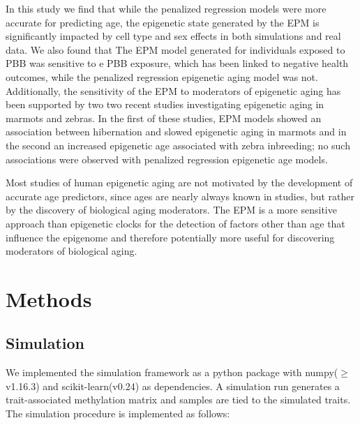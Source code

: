 \documentclass{article}
\begin{document}
{{\begin{linenumbers}
In this study we find that while the penalized regression models were more accurate for predicting age, the epigenetic 
state generated by the EPM is significantly impacted by  cell type and sex effects in both simulations and real data. 
We also found that The EPM model generated for individuals exposed to PBB was sensitive to e PBB exposure, which has 
been linked to negative health outcomes, while the penalized regression epigenetic aging model was not. Additionally, 
the sensitivity of the EPM to moderators of epigenetic aging has been supported by two two recent studies  
investigating epigenetic aging in marmots\cite{Pinho2021-gm} and zebras\cite{Larison2021-ts}. In the first of 
these studies, EPM models showed an association between hibernation and slowed epigenetic aging in marmots and 
in the second an increased epigenetic age associated with zebra inbreeding; no such associations were observed with 
penalized regression epigenetic age models. 

Most studies of human epigenetic aging are not motivated by the development of accurate age predictors, since ages 
are nearly always known in studies,  but rather by the discovery of  biological aging moderators. The EPM is a more 
sensitive approach than epigenetic clocks for the detection of factors other than age that influence the epigenome  
and therefore potentially more useful for discovering moderators of biological aging. 

\section{Methods}

\subsection{Simulation}

We implemented the simulation framework as a python package with numpy($\geq$v1.16.3)\cite{Harris2020-yb} and 
scikit-learn(v0.24)\cite{Pedregosa2011-fi} as dependencies. A simulation run generates  a trait-associated methylation
matrix and samples are tied to the simulated  traits. The simulation procedure is implemented as follows:
\begin{itemize}


\end{itemize}
\end{linenumbers}}}
\end{document}

